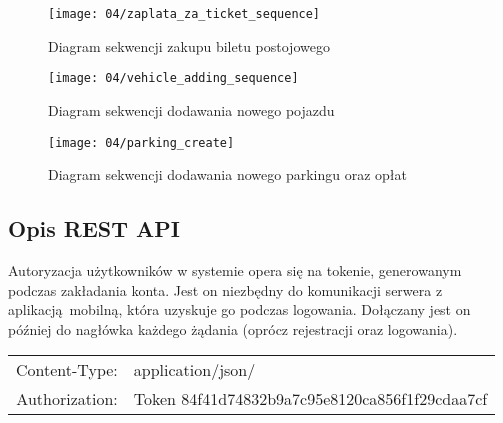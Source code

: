 \begin{figure}[p]
	\begin{center}
		\texttt{[image: 04/zaplata\_za\_ticket\_sequence]}
	\end{center}
	\caption{Diagram sekwencji zakupu biletu postojowego}
\end{figure}

\begin{figure}[p]
	\begin{center}
		\texttt{[image: 04/vehicle\_adding\_sequence]}
	\end{center}
	\caption{Diagram sekwencji dodawania nowego pojazdu}
\end{figure}

\begin{figure}[p]
	\begin{center}
		\texttt{[image: 04/parking\_create]}
	\end{center}
	\caption{Diagram sekwencji dodawania nowego parkingu oraz opłat}
\end{figure}

\newpage



\subsection{Opis REST API}

Autoryzacja użytkowników w systemie opera się na tokenie, generowanym podczas zakładania konta. Jest on niezbędny do komunikacji serwera z aplikacją mobilną, która uzyskuje go podczas logowania. Dołączany jest on później do nagłówka każdego żądania (oprócz rejestracji oraz logowania).

\label{naglowek_zadania}
\vspace{-0.3cm}
\begin{table}[h]
	\begin{center}
		\begin{tabular}{ rl }
			Content-Type:&application/json/\\
			Authorization:&Token 84f41d74832b9a7c95e8120ca856f1f29cdaa7cf\\
		\end{tabular}
	\end{center}
\end{table}

